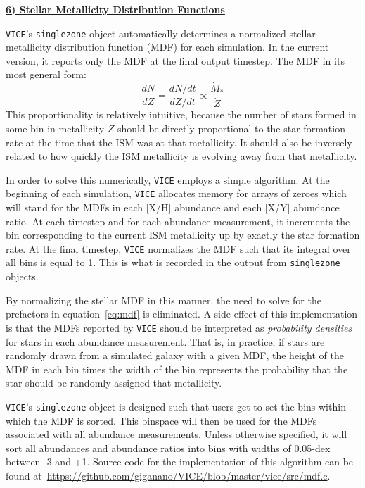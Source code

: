 \documentclass{report}
\begin{document}
\newpage 
\noindent 
\begin{center} 
\hypertarget{sec:mdfs}{
	\underline{\LARGE
		\textbf{6) Stellar Metallicity Distribution Functions}
	}
}
\end{center}
\texttt{VICE}'s \texttt{singlezone} object automatically determines a 
normalized stellar metallicity distribution function (MDF) for each simulation. 
In the current version, it reports only the MDF at the final output timestep. 
The MDF in its most general form: 
\begin{equation}
\label{eq:mdf}
\frac{dN}{dZ} = \frac{dN/dt}{dZ/dt} \propto \frac{\dot{M}_*}{\dot{Z}}
\end{equation}
This proportionality is relatively intuitive, because the number of stars 
formed in some bin in metallicity $Z$ should be directly proportional to the 
star formation rate at the time that the ISM was at that metallicity. It 
should also be inversely related to how quickly the ISM metallicity is 
evolving away from that metallicity. 
\par
In order to solve this numerically, \texttt{VICE} employs a simple algorithm. 
At the beginning of each simulation, \texttt{VICE} allocates memory for arrays 
of zeroes which will stand for the MDFs in each [X/H] abundance and each [X/Y] 
abundance ratio. At each timestep and for each abundance measurement, it 
increments the bin corresponding to the current ISM metallicity up by exactly 
the star formation rate. At the final timestep, \texttt{VICE} normalizes the 
MDF such that its integral over all bins is equal to 1. This is what is 
recorded in the output from \texttt{singlezone} objects. 
\par
By normalizing the stellar MDF in this manner, the need to solve for the 
prefactors in equation~\ref{eq:mdf} is eliminated. A side effect of this 
implementation is that the MDFs reported by \texttt{VICE} should be 
interpreted as \textit{probability densities} for stars in each abundance 
measurement. That is, in practice, if stars are randomly drawn from a 
simulated galaxy with a given MDF, the height of the MDF in each bin times the 
width of the bin represents the probability that the star should be randomly 
assigned that metallicity. 
\par
\texttt{VICE}'s \texttt{singlezone} object is designed such that users get to 
set the bins within which the MDF is sorted. This binspace will then be used 
for the MDFs associated with all abundance measurements. Unless otherwise 
specified, it will sort all abundances and abundance ratios into bins with 
widths of 0.05-dex between -3 and +1. Source code for the implementation of 
this algorithm can be found 
at~\url{https://github.com/giganano/VICE/blob/master/vice/src/mdf.c}. 
\end{document}
